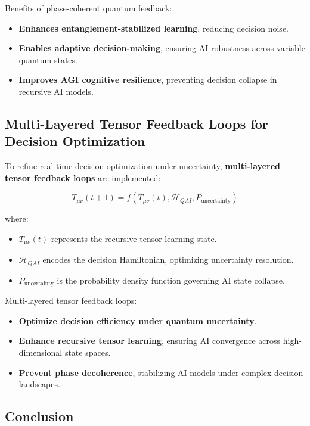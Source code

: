 \documentclass{article}
\theoremstyle{plain}
\begin{document}
\begin{itemize}
Benefits of phase-coherent quantum feedback:
\begin{itemize}
    \item \textbf{Enhances entanglement-stabilized learning}, reducing decision noise.
    \item \textbf{Enables adaptive decision-making}, ensuring AI robustness across variable quantum states.
    \item \textbf{Improves AGI cognitive resilience}, preventing decision collapse in recursive AI models.
\end{itemize}

\subsection{Multi-Layered Tensor Feedback Loops for Decision Optimization}

To refine real-time decision optimization under uncertainty, \textbf{multi-layered tensor feedback loops} are implemented:

\begin{equation}
    T_{\mu\nu}(t+1) = f(T_{\mu\nu}(t), \mathcal{H}_{QAI}, P_{\text{uncertainty}})
\end{equation}

where:
\begin{itemize}
    \item \( T_{\mu\nu}(t) \) represents the recursive tensor learning state.
    \item \( \mathcal{H}_{QAI} \) encodes the decision Hamiltonian, optimizing uncertainty resolution.
    \item \( P_{\text{uncertainty}} \) is the probability density function governing AI state collapse.
\end{itemize}

Multi-layered tensor feedback loops:
\begin{itemize}
    \item \textbf{Optimize decision efficiency under quantum uncertainty}.
    \item \textbf{Enhance recursive tensor learning}, ensuring AI convergence across high-dimensional state spaces.
    \item \textbf{Prevent phase decoherence}, stabilizing AI models under complex decision landscapes.
\end{itemize}

\subsection{Conclusion}


\end{itemize}
\end{document}
